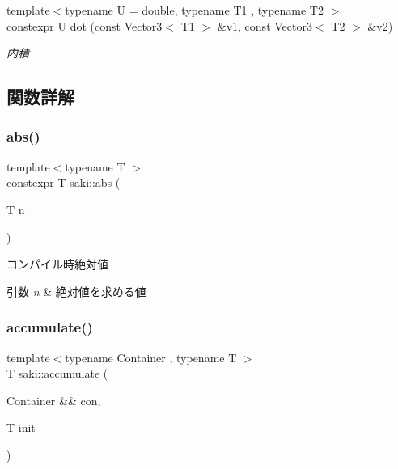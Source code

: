 \begin{DoxyCompactItemize}
{\footnotesize template$<$typename U  = double, typename T1 , typename T2 $>$ }\\constexpr U \mbox{\hyperlink{namespacesaki_a4f2643c9bd618538a43cdad4a71398af}{dot}} (const \mbox{\hyperlink{classsaki_1_1_vector3}{Vector3}}$<$ T1 $>$ \&v1, const \mbox{\hyperlink{classsaki_1_1_vector3}{Vector3}}$<$ T2 $>$ \&v2)
\begin{DoxyCompactList}\small\item\em 内積 \end{DoxyCompactList}\end{DoxyCompactItemize}


\subsection{関数詳解}
\mbox{\label{namespacesaki_a012046e05c5909bb34ca3e609ca74ff3}} 
\subsubsection{\texorpdfstring{abs()}{abs()}}
{\footnotesize\ttfamily template$<$typename T $>$ \\
constexpr T saki\+::abs (\begin{DoxyParamCaption}\item[{T}]{n }\end{DoxyParamCaption})}



コンパイル時絶対値 


\begin{DoxyParams}{引数}
{\em n} & 絶対値を求める値 \\
\hline
\end{DoxyParams}
\mbox{\label{namespacesaki_a8cb1089e57771254bd2d09f6b3d73472}} 
\subsubsection{\texorpdfstring{accumulate()}{accumulate()}\hspace{0.1cm}{\footnotesize\ttfamily [1/2]}}
{\footnotesize\ttfamily template$<$typename Container , typename T $>$ \\
T saki\+::accumulate (\begin{DoxyParamCaption}\item[{Container \&\&}]{con,  }\item[{T}]{init }\end{DoxyParamCaption})}



